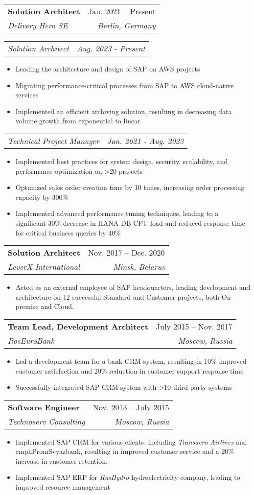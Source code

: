 \documentclass[letterpaper,11pt]{article}
\makeatletter
\newcommand{\resumeItem}[1]{
  \item\small{
    {#1 \vspace{-2pt}}
  }
}
\newcommand{\resumeSubheading}[4]{
  \vspace{-2pt}\item
    \begin{tabular*}{0.97\textwidth}[t]{l@{\extracolsep{\fill}}r}
      \textbf{#1} & #2 \\
      \textit{\small#3} & \textit{\small #4} \\
    \end{tabular*}\vspace{-7pt}
}
\newcommand{\resumeSubSubheading}[2]{
    \item
    \begin{tabular*}{0.97\textwidth}{l@{\extracolsep{\fill}}r}
      \textit{\small#1} & \textit{\small #2} \\
    \end{tabular*}\vspace{-7pt}
}
\newcommand{\resumeItemListStart}{\begin{itemize}}
\newcommand{\resumeItemListEnd}{\end{itemize}\vspace{-5pt}}
\makeatother
\begin{document}
    \resumeSubheading
      {Solution Architect}{Jan. 2021 -- Present}
      {Delivery Hero SE}{Berlin, Germany}
      \resumeSubSubheading
        {Solution Architect}{Aug. 2023 - Present}
          \resumeItemListStart
            \resumeItem{Leading the architecture and design of SAP on AWS projects}
            \resumeItem{Migrating performance-critical processes from SAP to AWS cloud-native services}
            \resumeItem{Implemented an efficient archiving solution, resulting in decreasing data volume growth from exponential to linear}
          \resumeItemListEnd
       \resumeSubSubheading
        {Technical Project Manager}{Jan. 2021 - Aug. 2023}
        \resumeItemListStart
           \resumeItem{Implemented best practices for system design, security, scalability, and performance optimization on \textgreater20  projects}
           \resumeItem{Optimized sales order creation time by 10 times, increasing order processing capacity by 300\%}
           \resumeItem{Implemented advanced performance tuning techniques, leading to a significant 30\% decrease in HANA DB CPU load and reduced response time for critical business queries by 40\%}
        \resumeItemListEnd
    \resumeSubheading
      {Solution Architect}{Nov. 2017 -- Dec. 2020}
      {LeverX International}{Minsk, Belarus}
      \resumeItemListStart
        \resumeItem{Acted as an external employee of SAP headquarters, leading development and architecture on 12 successful Standard and Customer projects, both On-premise and Cloud.}
    \resumeItemListEnd

    \resumeSubheading
      {Team Lead, Development Architect}{July 2015 -- Nov. 2017}
      {RosEuroBank}{Moscow, Russia}
      \resumeItemListStart
        \resumeItem{Led a development team for a bank CRM system, resulting in 10\% improved customer satisfaction and 20\% reduction in customer support response time}
        \resumeItem{Successfully integrated SAP CRM system with \textgreater10 third-party systems}
      \resumeItemListEnd

    \resumeSubheading
      {Software Engineer}{Nov. 2013 -- July 2015}
      {Technoserv Consulting}{Moscow, Russia}
      \resumeItemListStart
        \resumeItem{Implemented SAP CRM for various clients, including \emph{Transaero Airlines} and emph{PromSvyazbank}, resulting in improved customer service and a 20\% increase in customer retention.}
        \resumeItem{Implemented SAP ERP for \emph{RusHydro} hydroelectricity company, leading to improved resource management}
    \resumeItemListEnd
\end{document}
